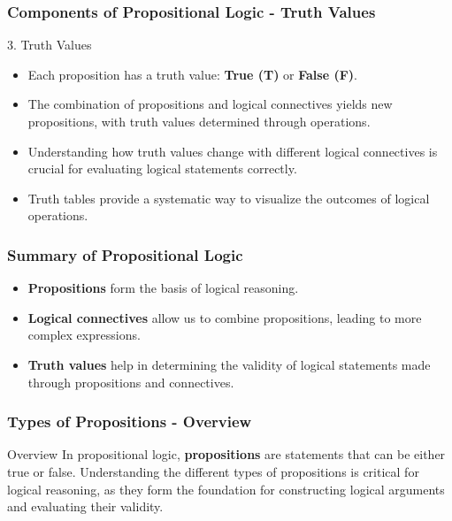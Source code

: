 \documentclass[aspectratio=169]{beamer}
\begin{document}
\begin{frame}[fragile]
    \frametitle{Components of Propositional Logic - Truth Values}
    \begin{block}{3. Truth Values}
        \begin{itemize}
            \item Each proposition has a truth value: \textbf{True (T)} or \textbf{False (F)}.
            \item The combination of propositions and logical connectives yields new propositions, with truth values determined through operations.
            \item Understanding how truth values change with different logical connectives is crucial for evaluating logical statements correctly.
            \item Truth tables provide a systematic way to visualize the outcomes of logical operations.
        \end{itemize}
    \end{block}
\end{frame}

\begin{frame}[fragile]
    \frametitle{Summary of Propositional Logic}
    \begin{itemize}
        \item \textbf{Propositions} form the basis of logical reasoning.
        \item \textbf{Logical connectives} allow us to combine propositions, leading to more complex expressions.
        \item \textbf{Truth values} help in determining the validity of logical statements made through propositions and connectives.
    \end{itemize}
\end{frame}

\begin{frame}[fragile]
    \frametitle{Types of Propositions - Overview}
    \begin{block}{Overview}
        In propositional logic, \textbf{propositions} are statements that can be either true or false. Understanding the different types of propositions is critical for logical reasoning, as they form the foundation for constructing logical arguments and evaluating their validity.
    \end{block}
\end{frame}
\end{document}
